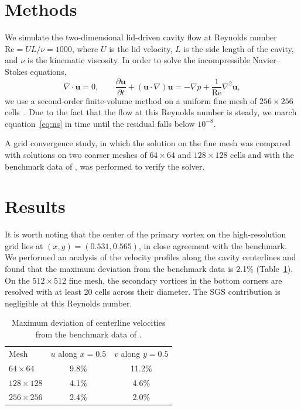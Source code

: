 \section{Methods}

We simulate the two-dimensional lid-driven cavity flow at Reynolds number
$\mathrm{Re} = UL/\nu = 1000$, where $U$ is the lid velocity, $L$ is the side
length of the cavity, and $\nu$ is the kinematic viscosity. In order to solve
the incompressible Navier--Stokes equations,
\begin{equation}
  \nabla\cdot\mathbf{u} = 0, \qquad
  \frac{\partial \mathbf{u}}{\partial t} + (\mathbf{u}\cdot\nabla)\mathbf{u}
  = -\nabla p + \frac{1}{\mathrm{Re}}\nabla^{2}\mathbf{u},
  \label{eq:ns}
\end{equation}
we use a second-order finite-volume method on a uniform fine mesh of
$256 \times 256$ cells~\cite{ferziger2002}. Due to the fact that the flow at
this Reynolds number is steady, we march equation~\eqref{eq:ns} in time until
the residual falls below $10^{-8}$.

A grid convergence study, in which the solution on the fine mesh was compared
with solutions on two coarser meshes of $64 \times 64$ and $128 \times 128$
cells and with the benchmark data of \citet{ghia1982}, was performed to verify
the solver.

\section{Results}

It is worth noting that the center of the primary vortex on the high-resolution
grid lies at $(x, y) = (0.531, 0.565)$, in close agreement with the benchmark.
We performed an analysis of the velocity profiles along the cavity centerlines
and found that the maximum deviation from the benchmark data is 2.1\%
(Table~\ref{tab:error}). On the $512 \times 512$ fine mesh, the secondary
vortices in the bottom corners are resolved with at least 20 cells across their
diameter. The SGS contribution is negligible at this Reynolds number.

\begin{table}
  \caption{Maximum deviation of centerline velocities from the benchmark data
    of \citet{ghia1982}.}
  \label{tab:error}
  \begin{tabular}{lcc}
    Mesh & $u$ along $x = 0.5$ & $v$ along $y = 0.5$ \\
    $64 \times 64$   & 9.8\% & 11.2\% \\
    $128 \times 128$ & 4.1\% & 4.6\% \\
    $256 \times 256$ & 2.4\% & 2.0\% \\
  \end{tabular}
\end{table}
